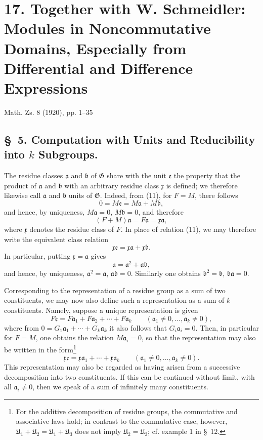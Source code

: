 \documentclass[11pt]{article}
\newcommand{\mG}{\mathfrak{G}}
\newcommand{\ma}{\mathfrak{a}}
\newcommand{\mb}{\mathfrak{b}}
\newcommand{\mx}{\mathfrak{x}}
\newcommand{\me}{\mathfrak{e}}
\newcommand{\mU}{\mathfrak{U}}
\begin{document}
\clearpage
\setcounter{footnote}{0}
\section*{17. Together with W. Schmeidler: Modules in Noncommutative Domains, Especially from Differential and Difference Expressions}
\begin{center}
Math. Zs. 8 (1920), pp. 1--35
\end{center}

\subsection*{\S~5. Computation with Units and Reducibility into $k$ Subgroups.}

The residue classes $\ma$ and $\mb$ of $\mG$ share with the unit $\me$ the property that the product of $\ma$ and $\mb$ with an arbitrary residue class $\mx$ is defined; we therefore likewise call $\ma$ and $\mb$ units of $\mG$. Indeed, from (11), for $F=M$, there follows
\[
 0=M\me=M\ma+M\mb,
\]
and hence, by uniqueness, $M\ma=0$, $M\mb=0$, and therefore
\[
 (F+M)\ma=F\ma=\mx\ma,
\]
where $\mx$ denotes the residue class of $F$. In place of relation (11), we may therefore write the equivalent class relation
\[
 \mx\me=\mx\ma+\mx\mb.
\]
In particular, putting $\mx=\ma$ gives
\[
 \ma=\ma^2+\ma\mb,
\]
and hence, by uniqueness, $\ma^2=\ma$, $\ma\mb=0$. Similarly one obtains $\mb^2=\mb$, $\mb\ma=0$.

Corresponding to the representation of a residue group as a sum of two constituents, we may now also define such a representation as a sum of $k$ constituents. Namely, suppose a unique representation is given
\[
 F\me=F\ma_1+F\ma_2+\cdots+F\ma_k\qquad(\ma_1\ne0,\ldots,\ma_k\ne0),
\]
where from $0=G_1\ma_1+\cdots+G_k\ma_k$ it also follows that $G_i\ma_i=0$. Then, in particular for $F=M$, one obtains the relation $M\ma_i=0$, so that the representation may also be written in the form\footnote{For the additive decomposition of residue groups, the commutative and associative laws hold; in contrast to the commutative case, however, $\mU_1+\mU_2=\mU_1+\mU_3$ does not imply $\mU_2=\mU_3$; cf. example 1 in \S~12.}
\begin{equation}
 \mx\me=\mx\ma_1+\cdots+\mx\ma_k\qquad(\ma_1\ne0,\ldots,\ma_k\ne0).
\tag{12}
\end{equation}
This representation may also be regarded as having arisen from a successive decomposition into two constituents. If this can be continued without limit, with all $\ma_i\ne0$, then we speak of a sum of infinitely many constituents.
\end{document}
